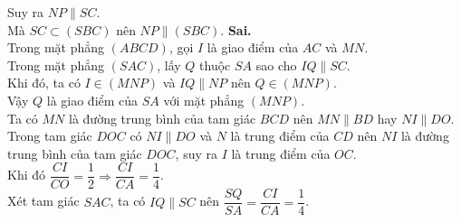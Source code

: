 \begin{ex}
{\begin{itemchoice}
   Suy ra $NP\parallel SC$.\\ 
   Mà $SC \subset(SBC)$ nên $NP\parallel(SBC)$. 
   \itemch \textbf{Sai.}\\ Trong mặt phẳng $(ABCD)$, gọi $I$ là giao điểm của $AC$ và  $MN$.\\
   Trong mặt phẳng $(SAC)$, lấy $Q$  thuộc $SA$ sao cho $IQ\parallel SC$.\\
   Khi đó,  ta có $I\in(MNP)$ và $IQ\parallel NP$ nên $Q\in(MNP)$.\\
   Vậy $Q$ là giao  điểm của $SA$ với mặt phẳng $(MNP)$.\\
   Ta có  $MN$ là đường trung bình của tam giác $BCD$ nên $MN\parallel BD$ hay $NI\parallel DO$.\\
   Trong tam giác $DOC$ có $NI\parallel DO$ và $N$ là trung điểm của $CD$ nên $NI$  là đường trung bình của tam giác $DOC$, suy ra $I$ là trung điểm của $OC$.\\
   Khi  đó $\dfrac{CI}{CO}=\dfrac{1}{2}\Rightarrow \dfrac{CI}{CA}=\dfrac{1}{4}$.\\
   Xét tam giác $SAC$,  ta có $IQ\parallel SC$ nên $\dfrac{SQ}{SA}=\dfrac{CI}{CA}=\dfrac{1}{4}$.
  \end{itemchoice}
  }
\end{ex}


